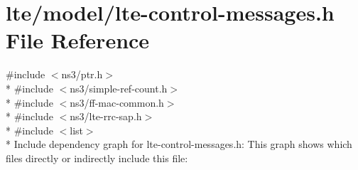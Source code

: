 \hypertarget{lte-control-messages_8h}{}\section{lte/model/lte-\/control-\/messages.h File Reference}
\label{lte-control-messages_8h}
{\ttfamily \#include $<$ns3/ptr.\+h$>$}\\*
{\ttfamily \#include $<$ns3/simple-\/ref-\/count.\+h$>$}\\*
{\ttfamily \#include $<$ns3/ff-\/mac-\/common.\+h$>$}\\*
{\ttfamily \#include $<$ns3/lte-\/rrc-\/sap.\+h$>$}\\*
{\ttfamily \#include $<$list$>$}\\*
Include dependency graph for lte-\/control-\/messages.h\+:
This graph shows which files directly or indirectly include this file\+:
